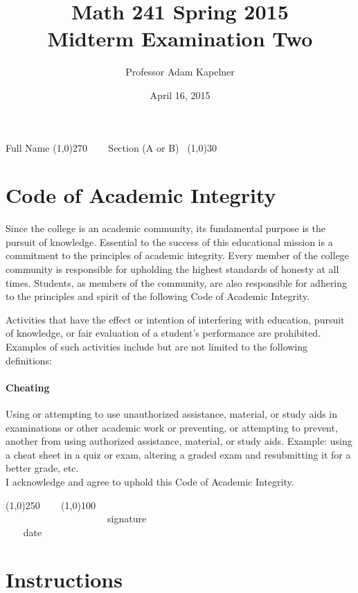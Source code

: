\documentclass[12pt]{article}
\title{Math 241 Spring 2015 \\ Midterm Examination Two}
\author{Professor Adam Kapelner}
\date{April 16, 2015}
\begin{document}
\maketitle

\noindent Full Name \line(1,0){270} ~~~ Section (A or B)~ \line(1,0){30}

\thispagestyle{empty}

\section*{Code of Academic Integrity}

\footnotesize
Since the college is an academic community, its fundamental purpose is the pursuit of knowledge. Essential to the success of this educational mission is a commitment to the principles of academic integrity. Every member of the college community is responsible for upholding the highest standards of honesty at all times. Students, as members of the community, are also responsible for adhering to the principles and spirit of the following Code of Academic Integrity.

Activities that have the effect or intention of interfering with education, pursuit of knowledge, or fair evaluation of a student's performance are prohibited. Examples of such activities include but are not limited to the following definitions:

\paragraph{Cheating} Using or attempting to use unauthorized assistance, material, or study aids in examinations or other academic work or preventing, or attempting to prevent, another from using authorized assistance, material, or study aids. Example: using a cheat sheet in a quiz or exam, altering a graded exam and resubmitting it for a better grade, etc.
\\

\noindent I acknowledge and agree to uphold this Code of Academic Integrity. \\

\begin{center}
\line(1,0){250} ~~~ \line(1,0){100}\\
~~~~~~~~~~~~~~~~~~~~~signature~~~~~~~~~~~~~~~~~~~~~~~~~~~~~~~~~~~~~~~~~~~~~ date
\end{center}

\normalsize

\section*{Instructions}
\end{document}
